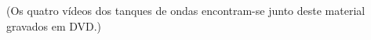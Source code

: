 \documentclass[a4paper,12pt,oneside,onecolumn,final,fleqn]{repUERJ}
\theoremstyle{plain}
\theoremstyle{definition}
\begin{document}
\appendix




\annex

(Os quatro vídeos dos tanques de ondas encontram-se junto deste material gravados em DVD.)


\printindex
\end{document}
